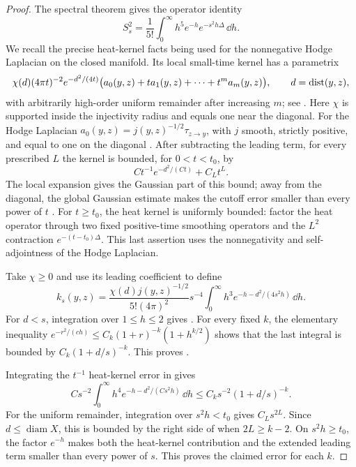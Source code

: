 \begin{proof}
The spectral theorem gives the operator identity
\begin{equation}\label{eq:current-gamma-resolvent}
 S_s^2=\frac1{5!}\int_0^\infty h^5e^{-h}e^{-s^2h\Delta}\,\dd h.
\end{equation}
We recall the precise heat-kernel facts being used for the nonnegative
Hodge Laplacian on the closed manifold. Its local small-time kernel
has a parametrix
\[
 \chi(d)(4\pi t)^{-2}e^{-d^2/(4t)}
       \bigl(a_0(y,z)+ta_1(y,z)+\cdots+t^ma_m(y,z)\bigr),
 \qquad d=\operatorname{dist}(y,z),
\]
with arbitrarily high-order uniform remainder after increasing $m$;
see \cite[Theorems~1.1 and~3.1]{Ludewig2019}.
Here $\chi$ is supported inside the injectivity radius and equals one
near the diagonal.  For the Hodge Laplacian
$a_0(y,z)=j(y,z)^{-1/2}\tau_{z\to y}$, with $j$ smooth, strictly
positive, and equal to one on the diagonal
\cite[Section~3, equation~(3.4), author version]{Ludewig2018}.
After subtracting the leading
term, for every prescribed $L$ the kernel is bounded, for
$0<t<t_0$, by
\[
 Ct^{-1}e^{-d^2/(Ct)}+C_Lt^L.
\]
The local expansion gives the Gaussian part of this bound; away from
the diagonal, the global Gaussian estimate makes the cutoff error
smaller than every power of $t$
\cite[Theorem~3.5]{Ludewig2019}. For $t\ge t_0$, the heat kernel is
uniformly bounded: factor the heat operator through two fixed
positive-time smoothing operators and the $L^2$ contraction
$e^{-(t-t_0)\Delta}$. This last assertion uses the nonnegativity and
self-adjointness of the Hodge Laplacian.

Take $\chi\ge0$ and use its leading coefficient to define
\[
 k_s(y,z)=\frac{\chi(d)j(y,z)^{-1/2}}{5!(4\pi)^2}s^{-4}
       \int_0^\infty h^3e^{-h-d^2/(4s^2h)}\,\dd h.
\]
For $d<s$, integration over $1\le h\le2$ gives
.  For every fixed $k$, the elementary
inequality
$e^{-r^2/(ch)}\le C_k(1+r)^{-k}(1+h^{k/2})$ shows that the last
integral is bounded by $C_k(1+d/s)^{-k}$.  This proves
.

Integrating the $t^{-1}$ heat-kernel error in
 gives
\[
 Cs^{-2}\int_0^\infty h^4e^{-h-d^2/(Cs^2h)}\,\dd h
 \le C_ks^{-2}(1+d/s)^{-k}.
\]
For the uniform remainder, integration over $s^2h<t_0$ gives
$C_Ls^{2L}$.  Since $d\le\operatorname{diam}X$, this is bounded by
the right side of  when
$2L\ge k-2$.  On $s^2h\ge t_0$, the factor $e^{-h}$ makes both the
heat-kernel contribution and the extended leading term smaller than
every power of $s$.  This proves the claimed error for each $k$.
\end{proof}

